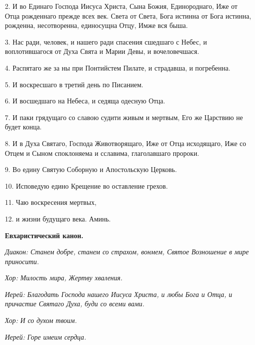 2. И во Единаго Господа Иисуса Христа, Сына Божия, Единороднаго,
     Иже от Отца рожденнаго прежде всех век. Света от Света, Бога
     истинна  от  Бога  истинна,  рожденна,  несотворенна,  единосущна
     Отцу, Имже вся быша.
     


3. Нас ради, человек, и нашего ради спасения сшедшаго с Небес, и
     воплотившагося от Духа Свята и Марии Девы, и вочеловечшася.
     


4. Распятаго  же  за  ны  при  Понтийстем  Пилате,  и  страдавша,  и
     погребенна.
     


5. И воскресшаго в третий день по Писанием.
     


6. И восшедшаго на Небеса, и седяща одесную Отца.
     


7. И паки грядущаго со славою судити живым и мертвым, Его же
     Царствию не будет конца.
     


8. И  в  Духа  Святаго,  Господа  Животворящаго,  Иже  от  Отца
     исходящаго,  Иже  со  Отцем  и  Сыном  споклоняема  и  сславима,
     глаголавшаго пророки.
     


9. Во едину Святую Соборную и Апостольскую Церковь.
     


10. Исповедую едино Крещение во оставление грехов.
     


11. Чаю воскресения мертвых,

     


12. и жизни будущаго века. Аминь.
     


 

\bfseries  Евхаристический канон.\normalfont{}


 \itshape Диакон:\normalfont{} Станем добре, станем со страхом, вонмем, Святое Возношение в
мире приносити.


 \itshape Хор:\normalfont{} Милость мира, Жертву хваления.


 \itshape Иерей:\normalfont{} Благодать Господа нашего Иисуса Христа, и любы Бога и Отца, и
причастие Святаго Духа, буди со всеми вами.


 \itshape Хор:\normalfont{} И со духом твоим.


 \itshape Иерей:\normalfont{} Горе имеим сердца.


